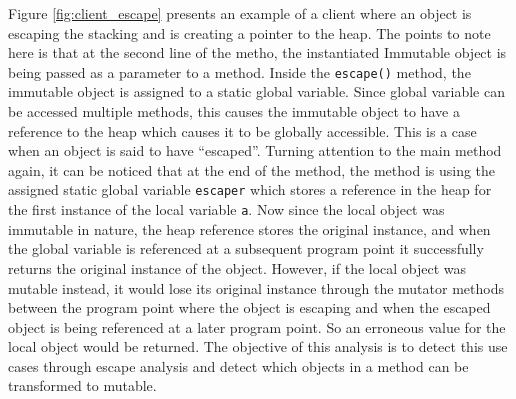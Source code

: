 Figure \ref{fig:client_escape} presents an example of a client where an object is escaping the stacking and is creating a pointer to the heap. The points to note here is that at the second line of the metho, the instantiated Immutable object is being passed as a parameter to a method. Inside the \texttt{escape()} method, the immutable object is assigned to a static global variable. Since global variable can be accessed multiple methods, this causes the immutable object to have a reference to the heap which causes it to be globally accessible. This is a case when an object is said to have ``escaped''. Turning attention to the main method again, it can be noticed that at the end of the method, the method is using the assigned static global variable \texttt{escaper} which stores a reference in the heap for the first instance of the local variable \texttt{a}. Now since the local object was immutable in nature, the heap reference stores the original instance, and when the global variable is referenced at a subsequent program point it successfully returns the original instance of the object. However, if the local object was mutable instead, it would lose its original instance through the mutator methods between the program point where  the object is escaping and when the escaped object is being referenced at a later program point. So an erroneous value for the local object would be returned. The objective of this analysis is to detect this use cases through escape analysis and detect which objects in a method can be transformed to mutable.
